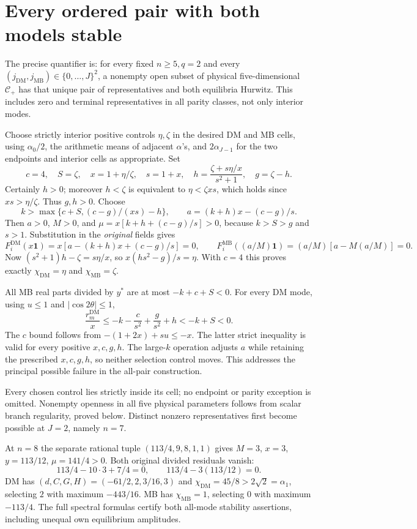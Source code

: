 \documentclass[11pt]{article}
\newcommand{\one}{\mathbf 1}
\newcommand{\DM}{\mathrm{DM}}
\newcommand{\MB}{\mathrm{MB}}
\begin{document}
\section{Every ordered pair with both models stable}
The precise quantifier is: for every fixed $n\ge5,q=2$ and every
$(j_{\DM},j_{\MB})\in\{0,\ldots,J\}^2$, a nonempty open subset
of physical five-dimensional $\mathcal C_+$ has that unique pair of
representatives and both equilibria Hurwitz. This includes zero and
terminal representatives in all parity classes, not only interior modes.

Choose strictly interior positive controls $\eta,\zeta$ in the desired
DM and MB cells, using $\alpha_0/2$, the arithmetic means of adjacent
$\alpha$'s, and $2\alpha_{J-1}$ for the two endpoints and interior
cells as appropriate. Set
\[
 c=4,\quad S=\zeta,\quad x=1+\eta/\zeta,\quad s=1+x,
 \quad h=\frac{\zeta+s\eta/x}{s^2+1},\quad g=\zeta-h.
\]
Certainly $h>0$; moreover $h<\zeta$ is equivalent to
$\eta<\zeta xs$, which holds since $xs>\eta/\zeta$. Thus $g,h>0$.
Choose
\[
 k>\max\{c+S,(c-g)/(xs)-h\},\qquad
 a=(k+h)x-(c-g)/s.
\]
Then $a>0$, $M>0$, and
$\mu=x[k+h+(c-g)/s]>0$, because $k>S>g$ and $s>1$.
Substitution in the \emph{original} fields gives
\[
 F_i^{\DM}(x\one)=x[a-(k+h)x+(c-g)/s]=0,
 \qquad F_i^{\MB}((a/M)\one)=(a/M)[a-M(a/M)]=0.
\]
Now $(s^2+1)h-\zeta=s\eta/x$, so
$x(hs^2-g)/s=\eta$. With $c=4$ this proves exactly
$\chi_{\DM}=\eta$ and $\chi_{\MB}=\zeta$.

All MB real parts divided by $y^*$ are at most $-k+c+S<0$.
For every DM mode, using $u\le1$ and $|\cos2\theta|\le1$,
\[
 \frac{r_m^{\DM}}x
 \le-k-\frac c{s^2}+\frac g{s^2}+h<-k+S<0.
\]
The $c$ bound follows from
$-(1+2x)+su\le-x$. The latter strict inequality is valid for every
positive $x,c,g,h$. The large-$k$ operation adjusts $a$ while retaining
the prescribed $x,c,g,h$, so neither selection control moves. This
addresses the principal possible failure in the all-pair construction.

Every chosen control lies strictly inside its cell; no endpoint or
parity exception is omitted. Nonempty openness in all five physical
parameters follows from scalar branch regularity, proved below. Distinct
nonzero representatives first become possible at $J=2$, namely $n=7$.

At $n=8$ the separate rational tuple $(113/4,9,8,1,1)$ gives
$M=3$, $x=3$, $y=113/12$, $\mu=141/4>0$. Both original divided
residuals vanish:
\[
 113/4-10\cdot3+7/4=0,\qquad113/4-3(113/12)=0.
\]
DM has $(d,C,G,H)=(-61/2,2,3/16,3)$ and
$\chi_{\DM}=45/8>2\sqrt2=\alpha_1$, selecting $2$ with
maximum $-443/16$. MB has $\chi_{\MB}=1$, selecting $0$ with
maximum $-113/4$. The full spectral formulas certify both all-mode
stability assertions, including unequal own equilibrium amplitudes.
\end{document}
